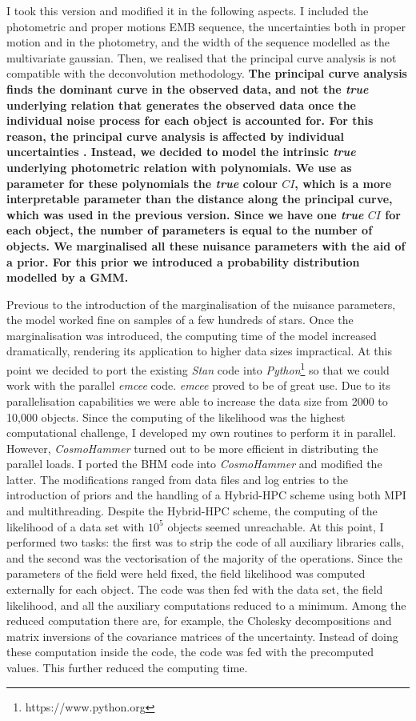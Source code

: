 I took this version and modified it in the following aspects. I included the photometric and proper motions EMB sequence, the uncertainties both in proper motion and in the photometry, and the width of the sequence modelled as the multivariate gaussian. Then, we realised that the principal curve analysis is not compatible with the deconvolution methodology. \textbf{The principal curve analysis finds the dominant curve in the observed data, and not the \emph{true} underlying relation that generates the observed data once the individual noise process for each object is accounted for. For this reason, the principal curve analysis is affected by individual uncertainties \cite[see][for the negative impact of heteroscedastic data on the related principal component analysis]{Huang2016}. Instead, we decided to model the intrinsic \emph{true} underlying photometric relation with polynomials. We use as parameter for these polynomials the \emph{true} colour $CI$, which is a more interpretable parameter than the distance along the principal curve, which was used in the previous version. Since we have one \emph{true} $CI$ for each object, the number of parameters is equal to the number of objects. We marginalised all these nuisance parameters with the aid of a prior. For this prior we introduced a probability distribution modelled by a GMM.}

Previous to the introduction of the marginalisation of the nuisance parameters, the model worked fine on samples of a few hundreds of stars. Once the marginalisation was introduced, the computing time of the model increased dramatically, rendering its application to higher data sizes impractical. At this point we decided to port the existing \emph{Stan} code into \emph
{Python}\footnote{https://www.python.org} so that we could work with the parallel \emph{emcee} code. \emph{emcee} proved to be of great use. Due to its parallelisation capabilities we were able to increase the data size from 2000 to 10,000 objects. Since the computing of the likelihood was the highest computational challenge, I developed my own routines to perform it in parallel. However, \emph{CosmoHammer} \citep{Akeret2013} turned out to be more efficient in distributing the parallel loads. I ported the BHM code into \emph{CosmoHammer} and modified the latter. The modifications ranged from data files and log entries to the introduction of priors and the handling of a Hybrid-HPC scheme using both MPI and multithreading. Despite the Hybrid-HPC scheme, the computing of the likelihood of a data set with $10^5$ objects seemed unreachable. At this point, I performed two tasks: the first was to strip the code of all auxiliary libraries calls, and the second was the vectorisation of the majority of the operations. Since the parameters of the field were held fixed, the field likelihood was computed externally for each object. The code was then fed with the data set, the field likelihood, and all the auxiliary computations reduced to a minimum. Among the reduced computation there are, for example, the Cholesky decompositions and matrix inversions of the covariance matrices of the uncertainty. Instead of doing these computation inside the code, the code was fed with the precomputed values. This further reduced the computing time.

